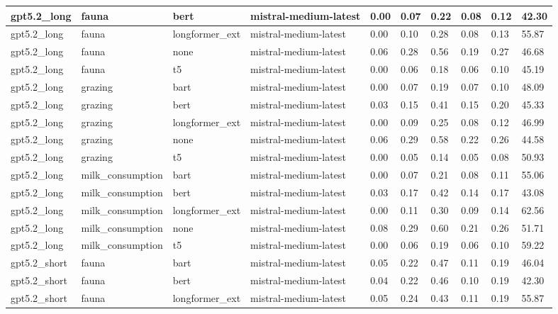 \begin{tabular}{|l|l|l|l|l|l|l|l|l|l|}
 \hline
 gpt5.2\_long & fauna & bert & mistral-medium-latest & 0.00 & 0.07 & 0.22 & 0.08 & 0.12 & 42.30 \\
 \hline
 gpt5.2\_long & fauna & longformer\_ext & mistral-medium-latest & 0.00 & 0.10 & 0.28 & 0.08 & 0.13 & 55.87 \\
 \hline
 gpt5.2\_long & fauna & none & mistral-medium-latest & 0.06 & 0.28 & 0.56 & 0.19 & 0.27 & 46.68 \\
 \hline
 gpt5.2\_long & fauna & t5 & mistral-medium-latest & 0.00 & 0.06 & 0.18 & 0.06 & 0.10 & 45.19 \\
 \hline
 gpt5.2\_long & grazing & bart & mistral-medium-latest & 0.00 & 0.07 & 0.19 & 0.07 & 0.10 & 48.09 \\
 \hline
 gpt5.2\_long & grazing & bert & mistral-medium-latest & 0.03 & 0.15 & 0.41 & 0.15 & 0.20 & 45.33 \\
 \hline
 gpt5.2\_long & grazing & longformer\_ext & mistral-medium-latest & 0.00 & 0.09 & 0.25 & 0.08 & 0.12 & 46.99 \\
 \hline
 gpt5.2\_long & grazing & none & mistral-medium-latest & 0.06 & 0.29 & 0.58 & 0.22 & 0.26 & 44.58 \\
 \hline
 gpt5.2\_long & grazing & t5 & mistral-medium-latest & 0.00 & 0.05 & 0.14 & 0.05 & 0.08 & 50.93 \\
 \hline
 gpt5.2\_long & milk\_consumption & bart & mistral-medium-latest & 0.00 & 0.07 & 0.21 & 0.08 & 0.11 & 55.06 \\
 \hline
 gpt5.2\_long & milk\_consumption & bert & mistral-medium-latest & 0.03 & 0.17 & 0.42 & 0.14 & 0.17 & 43.08 \\
 \hline
 gpt5.2\_long & milk\_consumption & longformer\_ext & mistral-medium-latest & 0.00 & 0.11 & 0.30 & 0.09 & 0.14 & 62.56 \\
 \hline
 gpt5.2\_long & milk\_consumption & none & mistral-medium-latest & 0.08 & 0.29 & 0.60 & 0.21 & 0.26 & 51.71 \\
 \hline
 gpt5.2\_long & milk\_consumption & t5 & mistral-medium-latest & 0.00 & 0.06 & 0.19 & 0.06 & 0.10 & 59.22 \\
 \hline
 gpt5.2\_short & fauna & bart & mistral-medium-latest & 0.05 & 0.22 & 0.47 & 0.11 & 0.19 & 46.04 \\
 \hline
 gpt5.2\_short & fauna & bert & mistral-medium-latest & 0.04 & 0.22 & 0.46 & 0.10 & 0.19 & 42.30 \\
 \hline
 gpt5.2\_short & fauna & longformer\_ext & mistral-medium-latest & 0.05 & 0.24 & 0.43 & 0.11 & 0.19 & 55.87 \\

\end{tabular}
